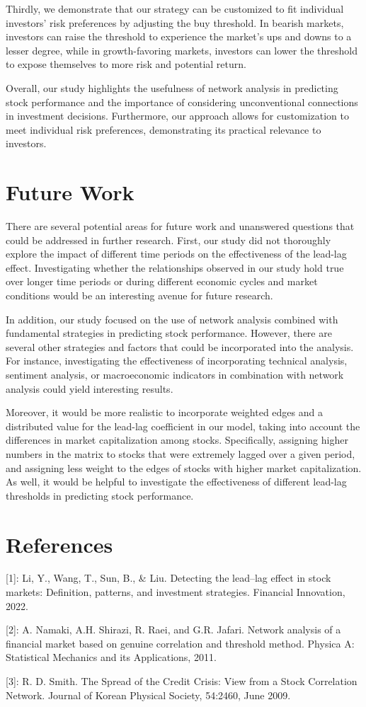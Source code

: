 \documentclass{article}
\begin{document}
Thirdly, we demonstrate that our strategy can be customized to fit individual investors' risk preferences by adjusting the buy threshold. In bearish markets, investors can raise the threshold to experience the market's ups and downs to a lesser degree, while in growth-favoring markets, investors can lower the threshold to expose themselves to more risk and potential return. 

Overall, our study highlights the usefulness of network analysis in predicting stock performance and the importance of considering unconventional connections in investment decisions. Furthermore, our approach allows for customization to meet individual risk preferences, demonstrating its practical relevance to investors.

\section{Future Work}
There are several potential areas for future work and unanswered questions that could be addressed in further research. First, our study did not thoroughly explore the impact of different time periods on the effectiveness of the lead-lag effect. Investigating whether the relationships observed in our study hold true over longer time periods or during different economic cycles and market conditions would be an interesting avenue for future research.

In addition, our study focused on the use of network analysis combined with fundamental strategies in predicting stock performance. However, there are several other strategies and factors that could be incorporated into the analysis. For instance, investigating the effectiveness of incorporating technical analysis, sentiment analysis, or macroeconomic indicators in combination with network analysis could yield interesting results. 

Moreover, it would be more realistic to incorporate weighted edges and a distributed value for the lead-lag coefficient in our model, taking into account the differences in market capitalization among stocks. Specifically, assigning higher numbers in the matrix to stocks that were extremely lagged over a given period, and assigning less weight to the edges of stocks with higher market capitalization. As well, it would be helpful to investigate the effectiveness of different lead-lag thresholds in predicting stock performance.

\section*{References}
[1]: Li, Y., Wang, T., Sun, B., \& Liu. Detecting the lead–lag effect in stock markets: Definition, patterns, and investment strategies. Financial Innovation, 2022.

[2]: A. Namaki, A.H. Shirazi, R. Raei, and G.R. Jafari. Network analysis of a financial market based on genuine correlation and threshold method. Physica A: Statistical
Mechanics and its Applications, 2011.

[3]: R. D. Smith. The Spread of the Credit Crisis: View
from a Stock Correlation Network. Journal of Korean
Physical Society, 54:2460, June 2009.

\medskip
\small
\end{document}
